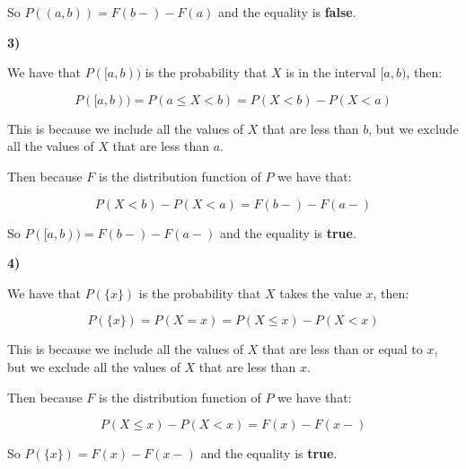\singlespacing

So $P((a, b)) = F(b-) - F(a)$ and the equality is \textbf{false}.

\singlespacing

\break

\textbf{3)}

\singlespacing

We have that $P([a, b))$ is the probability that $X$ is in the interval $[a, b)$, then:

\singlespacing

\begin{equation}
    P([a, b)) = P(a \leq X < b) = P(X < b) - P(X < a)
\end{equation}

\singlespacing

This is because we include all the values of $X$ that are less than $b$,
but we exclude all the values of $X$ that are less than $a$.

\singlespacing

Then because $F$ is the distribution function of $P$ we have that:

\singlespacing

\begin{equation}
    P(X < b) - P(X < a) = F(b-) - F(a-)
\end{equation}

\singlespacing

So $P([a, b)) = F(b-) - F(a-)$ and the equality is \textbf{true}.

\singlespacing
\singlespacing
\singlespacing

\textbf{4)}

\singlespacing

We have that $P(\{x\})$ is the probability that $X$ takes the value $x$, then:

\singlespacing

\begin{equation}
    P(\{x\}) = P(X = x) = P(X \leq x) - P(X < x)
\end{equation}

\singlespacing

This is because we include all the values of $X$ that are less than or equal to $x$,
but we exclude all the values of $X$ that are less than $x$.

\singlespacing

Then because $F$ is the distribution function of $P$ we have that:

\singlespacing

\begin{equation}
    P(X \leq x) - P(X < x) = F(x) - F(x-)
\end{equation}

\singlespacing

So $P(\{x\}) = F(x) - F(x-)$ and the equality is \textbf{true}.
